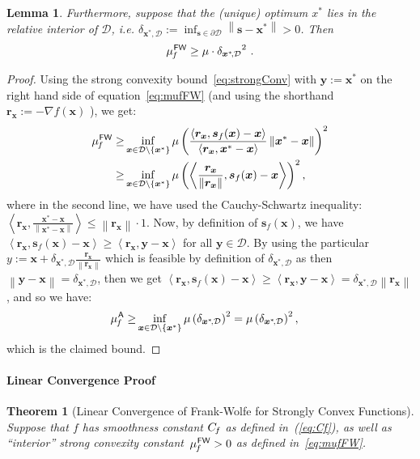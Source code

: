 \documentclass{article} %
\newtheorem{theorem}[definition]{Theorem}
\newtheorem{lemma}[definition]{Lemma}
\providecommand{\norm}[1]{\left\lVert#1\right\rVert}
\newcommand{\domain}{\mathcal{D}}
\newcommand{\FW}{{\hspace{0.05em}\textsf{FW}}}
\newcommand{\away}{{\hspace{0.06em}\textsf{A}}}
\newcommand{\Cf}{C_{\hspace{-0.08em}f}}
\newcommand{\strongConvFW}{\mu_{\hspace{-0.08em}f}^\FW}
\newcommand{\strongConvMFW}{\mu_{\hspace{-0.08em}f}^\away}
\newcommand{\distToBoundary}{{\delta_{\x^*\!,\domain}}}
\newcommand{\x}{\bm{x}}
\newcommand{\y}{\bm{y}}
\newcommand{\s}{\bm{s}}
\renewcommand{\r}{\bm{r}}
\newcommand{\innerProd}[2]{\left\langle #1 , #2 \right\rangle}
\newcommand{\0}{\mathbf{0}} %
\begin{document}
{\begin{lemma}
Furthermore, suppose that the (unique) optimum $x^*$ lies in the relative interior of $\domain$, i.e. $\distToBoundary := \inf_{\s\in\partial \domain} \norm{\s-\x^*} > 0$.
Then\vspace{-3mm}
\[
\strongConvFW \geq \mu \cdot \distToBoundary^2  \ .
\] %
\end{lemma}
\begin{proof}
Using the strong convexity bound~\eqref{eq:strongConv} with $\y := \x^*$ on the right hand side of equation~\eqref{eq:mufFW} (and using the shorthand $\r_{\x} := -\nabla f(\x)$ ), we get:
\begin{align} \label{eq:strongConvFW}
\strongConvFW \geq&   \inf_{\x\in \domain \setminus \{\x^*\}}
                      \mu \left(  \frac{\innerProd{\r_{\x}}{ \s_f(\x) - \x}}{\innerProd{\r_{\x}}{\x^*-\x}} \norm{\x^*-\x} \right)^2 \nonumber \\
		\geq&  \inf_{\x\in \domain \setminus \{\x^*\}}
		                      \mu \left(  \innerProd{\frac{\r_{\x}}{\norm{\r_{\x}}}}{ \s_f(\x) - \x} \right)^2 , \nonumber 
\end{align}
where in the second line, we have used the Cauchy-Schwartz inequality: $\innerProd{\r_{\x}}{\frac{\x^*-\x}{\norm{\x^*-\x}}} \leq \norm{\r_{\x}} \cdot 1$. Now, by definition of $\s_f(\x)$, we have $\innerProd{\r_{\x}}{ \s_f(\x) - \x} \geq \innerProd{\r_{\x}}{ \y - \x}$ for all $\y \in \domain$. By using the particular $y := \x + \distToBoundary \frac{\r_{\x}}{\norm{\r_{\x}}}$ which is feasible by definition of $\distToBoundary$ 
%
as then $\norm{\y-\x}=\distToBoundary$, then we get $\innerProd{\r_{\x}}{ \s_f(\x) - \x} \geq  \innerProd{\r_{\x}}{ \y - \x} = \distToBoundary \norm{\r_{\x}}$, and so we have:
\begin{align*}
\strongConvMFW \geq&   \inf_{\x\in \domain \setminus \{\x^*\}} 
                      \mu \left(  \distToBoundary \right)^2 = \mu \left(  \distToBoundary \right)^2,
\end{align*}
which is the claimed bound.
\end{proof}


\paragraph{Linear Convergence Proof}

\begin{theorem}[Linear Convergence of Frank-Wolfe for Strongly Convex Functions]\label{thm:linear_convergence_FW}
Suppose that $f$ has smoothness constant $\Cf$ as defined in~(\ref{eq:Cf}),
as well as ``interior'' strong convexity constant~$\strongConvFW > 0$ as defined in~\eqref{eq:mufFW}.
%


\end{theorem}}
\end{document}
